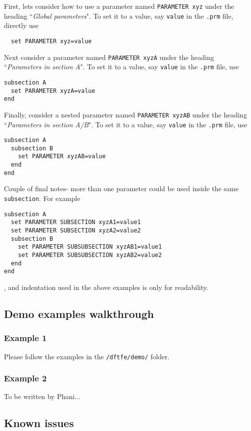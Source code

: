 First, lets consider how to use a parameter named \verb|PARAMETER xyz| under the heading ``{\it Global parameters}". To set it to a value, say \verb|value|  in the  \verb|.prm| file, directly use
\begin{verbatim}
  set PARAMETER xyz=value
\end{verbatim}
Next consider a parameter named \verb|PARAMETER xyzA| under the heading ``{\it Parameters in section A}". To set it to a value, say \verb|value|  in the  \verb|.prm| file, use 
\begin{verbatim}
subsection A
  set PARAMETER xyzA=value
end
\end{verbatim}
Finally, consider a nested parameter named  \verb|PARAMETER xyzAB| under the heading ``{\it Parameters in section A/B}". To set it to a value, say \verb|value|  in the  \verb|.prm| file, use 
\begin{verbatim}
subsection A
  subsection B
    set PARAMETER xyzAB=value
  end
end
\end{verbatim}
Couple of final notes- more than one parameter could be used inside the same \verb|subsection|. For example
\begin{verbatim}
subsection A
  set PARAMETER SUBSECTION xyzA1=value1
  set PARAMETER SUBSECTION xyzA2=value2
  subsection B
    set PARAMETER SUBSUBSECTION xyzAB1=value1
    set PARAMETER SUBSUBSECTION xyzAB2=value2
  end
end
\end{verbatim}
, and indentation used in the above examples is only for readability.
\subsection{Demo examples walkthrough}
\subsubsection{Example 1}
Please follow the examples in the \verb|/dftfe/demo/| folder.

\subsubsection{Example 2}
To be written by Phani...

\subsection{Known issues}
